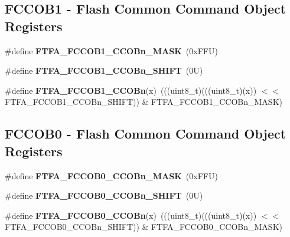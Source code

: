 \subsection*{F\+C\+C\+O\+B1 -\/ Flash Common Command Object Registers}
\begin{DoxyCompactItemize}
\item 
\mbox{\label{group___f_t_f_a___register___masks_ga17fce81c2555358f011d813a6f3904ac}} 
\#define {\bfseries F\+T\+F\+A\+\_\+\+F\+C\+C\+O\+B1\+\_\+\+C\+C\+O\+Bn\+\_\+\+M\+A\+SK}~(0x\+F\+F\+U)
\item 
\mbox{\label{group___f_t_f_a___register___masks_ga077f35706cef4a20a363eb6980f65baf}} 
\#define {\bfseries F\+T\+F\+A\+\_\+\+F\+C\+C\+O\+B1\+\_\+\+C\+C\+O\+Bn\+\_\+\+S\+H\+I\+FT}~(0\+U)
\item 
\mbox{\label{group___f_t_f_a___register___masks_ga4c29d83b6a844036b07db102da1daf0e}} 
\#define {\bfseries F\+T\+F\+A\+\_\+\+F\+C\+C\+O\+B1\+\_\+\+C\+C\+O\+Bn}(x)~(((uint8\+\_\+t)(((uint8\+\_\+t)(x)) $<$$<$ F\+T\+F\+A\+\_\+\+F\+C\+C\+O\+B1\+\_\+\+C\+C\+O\+Bn\+\_\+\+S\+H\+I\+FT)) \& F\+T\+F\+A\+\_\+\+F\+C\+C\+O\+B1\+\_\+\+C\+C\+O\+Bn\+\_\+\+M\+A\+SK)
\end{DoxyCompactItemize}
\subsection*{F\+C\+C\+O\+B0 -\/ Flash Common Command Object Registers}
\begin{DoxyCompactItemize}
\item 
\mbox{\label{group___f_t_f_a___register___masks_ga5b8b3b721c731e331fb126491693baf4}} 
\#define {\bfseries F\+T\+F\+A\+\_\+\+F\+C\+C\+O\+B0\+\_\+\+C\+C\+O\+Bn\+\_\+\+M\+A\+SK}~(0x\+F\+F\+U)
\item 
\mbox{\label{group___f_t_f_a___register___masks_gaab9715b8a9e69d256acd31421b32ce97}} 
\#define {\bfseries F\+T\+F\+A\+\_\+\+F\+C\+C\+O\+B0\+\_\+\+C\+C\+O\+Bn\+\_\+\+S\+H\+I\+FT}~(0\+U)
\item 
\mbox{\label{group___f_t_f_a___register___masks_gaea8b726f8e7f7efdb8ce4acbabe06495}} 
\#define {\bfseries F\+T\+F\+A\+\_\+\+F\+C\+C\+O\+B0\+\_\+\+C\+C\+O\+Bn}(x)~(((uint8\+\_\+t)(((uint8\+\_\+t)(x)) $<$$<$ F\+T\+F\+A\+\_\+\+F\+C\+C\+O\+B0\+\_\+\+C\+C\+O\+Bn\+\_\+\+S\+H\+I\+FT)) \& F\+T\+F\+A\+\_\+\+F\+C\+C\+O\+B0\+\_\+\+C\+C\+O\+Bn\+\_\+\+M\+A\+SK)
\end{DoxyCompactItemize}
